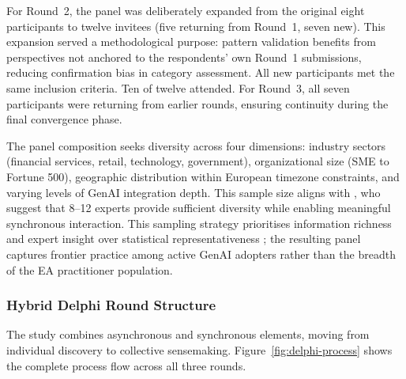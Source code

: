 For Round~2, the panel was deliberately expanded from the original eight
participants to twelve invitees (five returning from Round~1, seven new).
This expansion served a methodological purpose: pattern validation benefits
from perspectives not anchored to the respondents' own Round~1 submissions,
reducing confirmation bias in category assessment. All new participants met
the same inclusion criteria. Ten of twelve attended. For Round~3, all seven
participants were returning from earlier rounds, ensuring continuity during
the final convergence phase.

The panel composition seeks diversity across four dimensions: industry sectors
(financial services, retail, technology, government), organizational size (SME
to Fortune 500), geographic distribution within European timezone constraints,
and varying levels of GenAI integration depth.
This sample size aligns with \textcite{skulmoski_delphi_2007}, who suggest
that 8--12 experts provide sufficient diversity while enabling meaningful
synchronous interaction. This sampling strategy prioritises information richness
and expert insight over statistical representativeness
\parencite{patton_qualitative_2015}; the resulting panel captures frontier
practice among active GenAI adopters rather than the breadth of the EA
practitioner population.

\subsubsection{Hybrid Delphi Round Structure}

The study combines asynchronous and synchronous elements, moving from
individual discovery to collective sensemaking.
Figure~\ref{fig:delphi-process} shows the complete process flow across all
three rounds.

